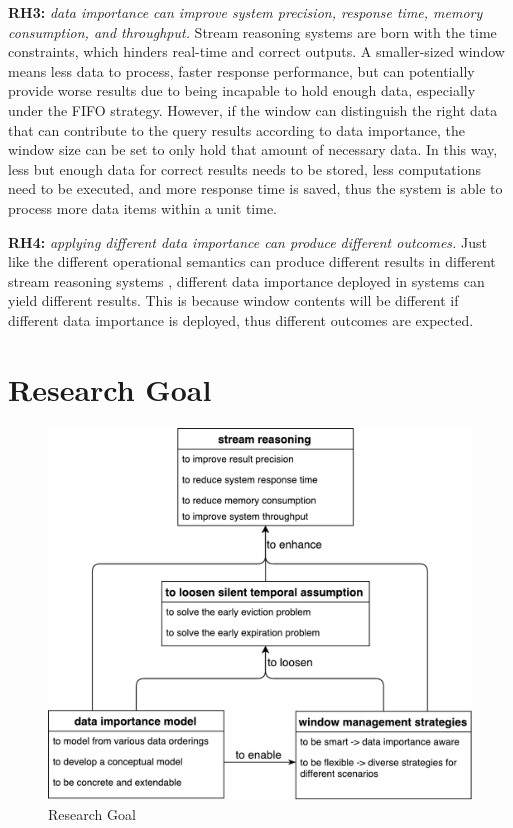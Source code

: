 \textbf{RH3:} \textit{data importance can improve system precision, response time, memory consumption, and throughput.}
Stream reasoning systems are born with the time constraints, which hinders real-time and correct outputs.
A smaller-sized window means less data to process, faster response performance, but can potentially provide worse results due to being incapable to hold enough data, especially under the FIFO strategy.
However, if the window can distinguish the right data that can contribute to the query results according to data importance, the window size can be set to only hold that amount of necessary data. 
In this way, less but enough data for correct results needs to be stored, less computations need to be executed, and more response time is saved, thus the system is able to process more data items within a unit time. 

\textbf{RH4:} \textit{applying different data importance can produce different outcomes.}
Just like the different operational semantics can produce different results in different stream reasoning systems \cite{dell2013correctness}, different data importance deployed in systems can yield different results. 
This is because window contents will be different if different data importance is deployed, thus different outcomes are expected. 
%
\section{Research Goal}

\begin{figure}[!htbp]
	\centering
    \includegraphics[width=5in]{img/1-rg.pdf}
    \caption{Research Goal}
    \label{fig:1-rg}
\end{figure}

